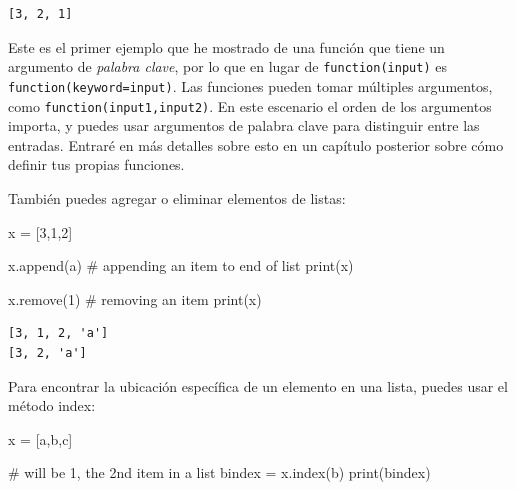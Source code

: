 \documentclass[
  letterpaper,
]{scrbook}
\newenvironment{Shaded}{\begin{snugshade}}{\end{snugshade}}
\newcommand{\BuiltInTok}[1]{\textcolor[rgb]{0.00,0.23,0.31}{#1}}
\newcommand{\CommentTok}[1]{\textcolor[rgb]{0.37,0.37,0.37}{#1}}
\newcommand{\DecValTok}[1]{\textcolor[rgb]{0.68,0.00,0.00}{#1}}
\newcommand{\NormalTok}[1]{\textcolor[rgb]{0.00,0.23,0.31}{#1}}
\newcommand{\OperatorTok}[1]{\textcolor[rgb]{0.37,0.37,0.37}{#1}}
\newcommand{\StringTok}[1]{\textcolor[rgb]{0.13,0.47,0.30}{#1}}
\begin{document}
\begin{verbatim}
[3, 2, 1]
\end{verbatim}

\begin{tcolorbox}[enhanced jigsaw, colbacktitle=quarto-callout-note-color!10!white, arc=.35mm, opacityback=0, colframe=quarto-callout-note-color-frame, colback=white, left=2mm, leftrule=.75mm, title={Note}, bottomtitle=1mm, rightrule=.15mm, toptitle=1mm, coltitle=black, titlerule=0mm, toprule=.15mm, bottomrule=.15mm, opacitybacktitle=0.6, breakable]

Este es el primer ejemplo que he mostrado de una función que tiene un
argumento de \emph{palabra clave}, por lo que en lugar de
\texttt{function(input)} es \texttt{function(keyword=input)}. Las
funciones pueden tomar múltiples argumentos, como
\texttt{function(input1,input2)}. En este escenario el orden de los
argumentos importa, y puedes usar argumentos de palabra clave para
distinguir entre las entradas. Entraré en más detalles sobre esto en un
capítulo posterior sobre cómo definir tus propias funciones.

\end{tcolorbox}

También puedes agregar o eliminar elementos de listas:

\begin{Shaded}
\begin{Highlighting}[]
\NormalTok{x }\OperatorTok{=}\NormalTok{ [}\DecValTok{3}\NormalTok{,}\DecValTok{1}\NormalTok{,}\DecValTok{2}\NormalTok{]}

\NormalTok{x.append(}\StringTok{\textquotesingle{}a\textquotesingle{}}\NormalTok{) }\CommentTok{\# appending an item to end of list}
\BuiltInTok{print}\NormalTok{(x)}

\NormalTok{x.remove(}\DecValTok{1}\NormalTok{) }\CommentTok{\# removing an item}
\BuiltInTok{print}\NormalTok{(x)}
\end{Highlighting}
\end{Shaded}

\begin{verbatim}
[3, 1, 2, 'a']
[3, 2, 'a']
\end{verbatim}

Para encontrar la ubicación específica de un elemento en una lista,
puedes usar el método index:

\begin{Shaded}
\begin{Highlighting}[]
\NormalTok{x }\OperatorTok{=}\NormalTok{ [}\StringTok{\textquotesingle{}a\textquotesingle{}}\NormalTok{,}\StringTok{\textquotesingle{}b\textquotesingle{}}\NormalTok{,}\StringTok{\textquotesingle{}c\textquotesingle{}}\NormalTok{]}

\CommentTok{\# will be 1, the 2nd item in a list}
\NormalTok{bindex }\OperatorTok{=}\NormalTok{ x.index(}\StringTok{\textquotesingle{}b\textquotesingle{}}\NormalTok{)}
\BuiltInTok{print}\NormalTok{(bindex)}
\end{Highlighting}
\end{Shaded}
\end{document}
